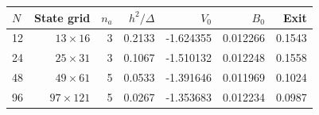 \begin{tabular}{lrrrrrr}
\toprule
$N$ & State grid & $n_a$ & $h^2/\Delta$ & $V_0$ & $B_0$ & Exit \\
\midrule
12 & $13\times16$ & 3 & 0.2133 & -1.624355 & 0.012266 & 0.1543 \\
24 & $25\times31$ & 3 & 0.1067 & -1.510132 & 0.012248 & 0.1558 \\
48 & $49\times61$ & 5 & 0.0533 & -1.391646 & 0.011969 & 0.1024 \\
96 & $97\times121$ & 5 & 0.0267 & -1.353683 & 0.012234 & 0.0987 \\
\bottomrule
\end{tabular}
